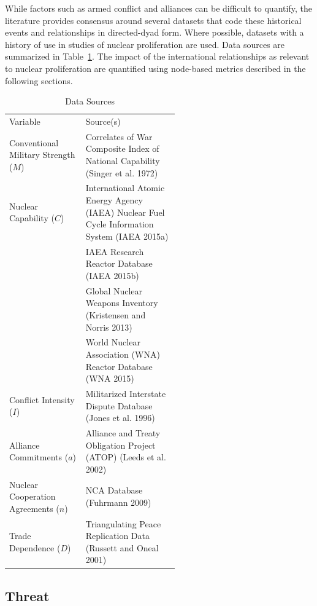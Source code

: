 \documentclass{article} %
\begin{document}
{While factors such as armed conflict and alliances can be difficult to quantify, the literature provides consensus around several datasets that code these historical events and relationships in directed-dyad form. Where possible, datasets with a history of use in studies of nuclear proliferation are used. Data sources are summarized in Table~\ref{data}. The impact of the international relationships as relevant to nuclear proliferation are quantified using node-based metrics described in the following sections.

\begin{table}
\centering
\caption{Data Sources \label{data}}
\begin{tabular}{l@{\hskip 0.2in}p{0.55\linewidth}}
\hline\noalign{\smallskip}
Variable & Source(s) \\
\noalign{\smallskip}
\hline
\noalign{\smallskip}
Conventional Military Strength ($M$) & Correlates of War Composite Index of National Capability (Singer et al. 1972) \\
Nuclear Capability ($C$) & International Atomic Energy Agency (IAEA) Nuclear Fuel Cycle Information System (IAEA 2015a) \\ 
& IAEA Research Reactor Database (IAEA 2015b) \\
& Global Nuclear Weapons Inventory (Kristensen and Norris 2013) \\
 & World Nuclear Association (WNA) Reactor Database (WNA 2015)\\
Conflict Intensity ($I$) & Militarized Interstate Dispute Database (Jones et al. 1996) \\
Alliance Commitments ($a$) & Alliance and Treaty Obligation Project (ATOP) (Leeds et al. 2002) \\
Nuclear Cooperation Agreements ($n$) & NCA Database (Fuhrmann 2009) \\
Trade Dependence ($D$) & Triangulating Peace Replication Data (Russett and Oneal 2001) \\
\hline
\end{tabular}
\end{table}

\subsection{Threat}

}
\end{document}
